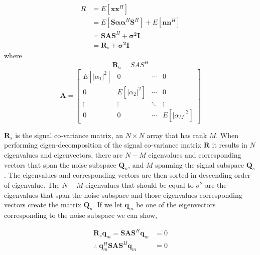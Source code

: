 \documentclass{UoNMCHA}
\numberwithin{equation}{section}
\begin{document}
    \begin{equation}
    \begin{split}
        R & =  E[\mathbf{xx}^H] \\
        & = E[\mathbf{S\alpha\alpha}^H\mathbf{S}^H] + E[\mathbf{nn}^H] \\
        & = \mathbf{SAS}^H + \mathbf{\sigma^2I}\\
        & = \mathbf{R}_s + \mathbf{\sigma^2 I}
    \end{split}
    \label{eq:covariance}
    \end{equation}
    where
    \begin{equation}
        \mathbf{R_s} = SAS^H
    \end{equation}
    \begin{equation} 
    \mathbf{A} = 
    \begin{bmatrix}
        E[|\alpha_1|^2] & 0 & \dotsm & 0\\ 
        0 & E[|\alpha_2|^2] & \dotsm & 0\\ 
        \vdots & \vdots & \ddots & \vdots\\ 
        0 & 0 & \dotsm & E[|\alpha_M|^2]
    \end{bmatrix}
    \end{equation}
    
    $\mathbf{R}_s$ is the signal co-variance matrix, an $N \times N$ array that has rank $M$. When performing eigen-decomposition of the signal co-variance matrix $\mathbf{R}$ it results in $N$ eigenvalues and eigenvectors, there are $N - M$ eigenvalues and corresponding vectors that span the noise subspace $\mathbf{Q}_n$, and $M$ spanning the signal subspace $\mathbf{Q}_s$.
    The eigenvalues and corresponding vectors are then sorted in descending order of eigenvalue. The $N-M$ eigenvalues that should be equal to $\sigma^2$ are the eigenvalues that span the noise subspace and those eigenvalues corresponding vectors create the matrix $\mathbf{Q}_n$. If we let $\mathbf{q}_m$ be one of the eigenvectors corresponding to the noise subspace we can show,
    
    \begin{equation}
    \begin{split}
        \mathbf{R}_s\mathbf{q}_m = \mathbf{SAS}^H\mathbf{q}_m & = 0\\
        \therefore \; \mathbf{q}_m^H\mathbf{SAS}^H\mathbf{q}_m & = 0
    \end{split}
    \end{equation}
\end{document}

